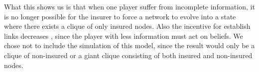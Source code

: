 What this shows us is that when one player suffer from incomplete information, it is no longer possible for the insurer to force a network to evolve into a state where there exists a clique of only insured nodes. Also the incentive for establish links decreases , since the player with less information must act on beliefs.  
We chose not to include the simulation of this model, since the result would only be a clique of non-insured or a giant clique consisting of both insured and non-insured nodes.  



